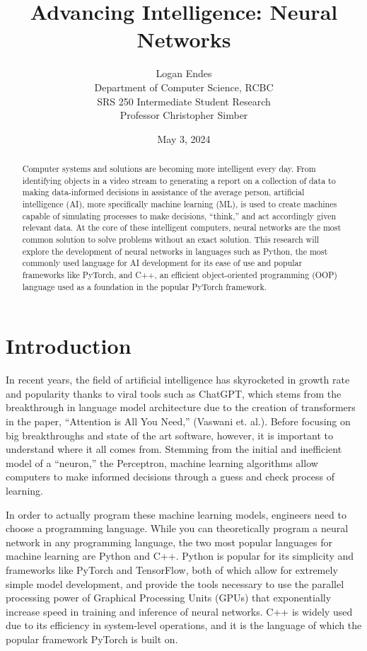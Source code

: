 \documentclass[12pt, letter]{article}
\title{Advancing Intelligence: Neural Networks
}
\author{Logan Endes \\ Department of Computer Science, RCBC \\ SRS 250 Intermediate Student Research \\ Professor Christopher Simber}
\date{May 3, 2024}
\begin{document}
\maketitle


\break


\begin{abstract}

Computer systems and solutions are becoming more intelligent every day. From identifying objects in a video stream to generating a report on a collection of data to making data-informed decisions in assistance of the average person, artificial intelligence (AI), more specifically machine learning (ML), is used to create machines capable of simulating processes to make decisions, “think,” and act accordingly given relevant data. At the core of these intelligent computers, neural networks are the most common solution to solve problems without an exact solution. This research will explore the development of neural networks in languages such as Python, the most commonly used language for AI development for its ease of use and popular frameworks like PyTorch, and C++, an efficient object-oriented programming (OOP) language used as a foundation in the popular PyTorch framework.


\end{abstract}





\section{Introduction} 


In recent years, the field of artificial intelligence has skyrocketed in growth rate and popularity thanks to viral tools such as ChatGPT, which stems from the breakthrough in language model architecture due to the creation of transformers in the paper, “Attention is All You Need,” (Vaswani et. al.). Before focusing on big breakthroughs and state of the art software, however, it is important to understand where it all comes from. Stemming from the initial and inefficient model of a “neuron,” the Perceptron, machine learning algorithms allow computers to make informed decisions through a guess and check process of learning.


In order to actually program these machine learning models, engineers need to choose a programming language. While you can theoretically program a neural network in any programming language, the two most popular languages for machine learning are Python and C++. Python is popular for its simplicity and frameworks like PyTorch and TensorFlow, both of which allow for extremely simple model development, and provide the tools necessary to use the parallel processing power of Graphical Processing Units (GPUs) that exponentially increase speed in training and inference of neural networks. C++ is widely used due to its efficiency in system-level operations, and it is the language of which the popular framework PyTorch is built on. 
\end{document}
